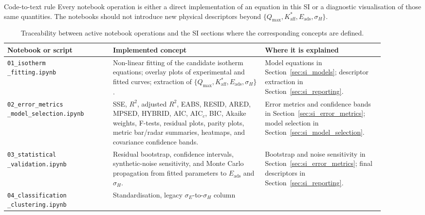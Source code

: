 \documentclass[journal=jacsat,manuscript=article]{achemso}
\begin{document}
\begin{bluebox}{Code-to-text rule}
	Every notebook operation is either a direct implementation of an
	equation in this SI or a diagnostic visualisation of those same
	quantities. The notebooks should not introduce new physical
	descriptors beyond
	\(\{Q_{\max},K_{\mathrm{aff}}^{\ast},E_{\mathrm{ads}},\sigma_H\}\).
\end{bluebox}

\begin{table}[H]
	\centering
	\caption{Traceability between active notebook operations and the
	SI sections where the corresponding concepts are defined.}
	\label{tab:si_notebook_traceability}
	\small
	\begin{tabular}{p{0.25\linewidth}p{0.36\linewidth}p{0.29\linewidth}}
		\toprule
		\textbf{Notebook or script} & \textbf{Implemented concept} &
		\textbf{Where it is explained} \\
		\midrule
		\makecell[l]{\texttt{01\_isotherm}\\\texttt{\_fitting.ipynb}} &
		Non-linear fitting of the candidate isotherm equations;
		overlay plots of experimental and fitted curves; extraction of
		\(\{Q_{\max},K_{\mathrm{aff}}^{\ast},E_{\mathrm{ads}},\sigma_H\}\). &
		Model equations in Section~\ref{sec:si_models}; descriptor
		extraction in Section~\ref{sec:si_reporting}. \\
		\addlinespace
		\makecell[l]{\texttt{02\_error\_metrics}\\\texttt{\_model\_selection.ipynb}} &
		SSE, \(R^2\), adjusted \(R^2\), EABS, RESID, ARED, MPSED,
		HYBRID, AIC, AIC$_c$, BIC, Akaike weights, F-tests, residual
		plots, parity plots, metric bar/radar summaries, heatmaps, and
		covariance confidence bands. &
		Error metrics and confidence bands in Section~\ref{sec:si_error_metrics};
		model selection in Section~\ref{sec:si_model_selection}. \\
		\addlinespace
		\makecell[l]{\texttt{03\_statistical}\\\texttt{\_validation.ipynb}} &
		Residual bootstrap, confidence intervals, synthetic-noise
		sensitivity, and Monte Carlo propagation from fitted parameters
		to \(E_{\mathrm{ads}}\) and \(\sigma_H\). &
		Bootstrap and noise sensitivity in Section~\ref{sec:si_error_metrics};
		final descriptors in Section~\ref{sec:si_reporting}. \\
		\addlinespace
		\makecell[l]{\texttt{04\_classification}\\\texttt{\_clustering.ipynb}} &
		Standardisation, legacy \(\sigma_E\)-to-\(\sigma_H\) column

\end{tabular}
\end{table}
\end{document}
